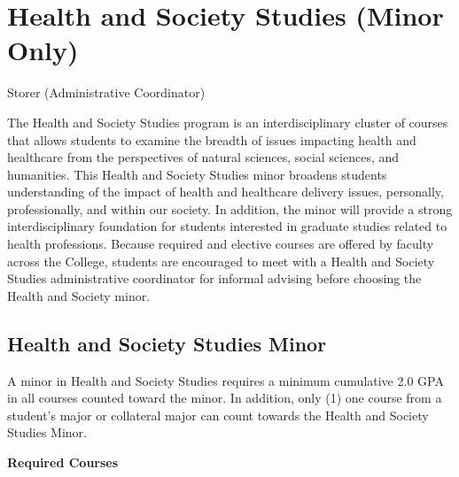 \documentclass[
  letterpaper,
]{scrbook}
\begin{document}
\section{Health and Society Studies (Minor
Only)}\label{health-and-society-studies-minor-only}

Storer (Administrative Coordinator)

The Health and Society Studies program is an interdisciplinary cluster
of courses that allows students to examine the breadth of issues
impacting health and healthcare from the perspectives of natural
sciences, social sciences, and humanities. This Health and Society
Studies minor broadens students understanding of the impact of health
and healthcare delivery issues, personally, professionally, and within
our society. In addition, the minor will provide a strong
interdisciplinary foundation for students interested in graduate studies
related to health professions. Because required and elective courses are
offered by faculty across the College, students are encouraged to meet
with a Health and Society Studies administrative coordinator for
informal advising before choosing the Health and Society minor.

\subsection{Health and Society Studies
Minor}\label{health-and-society-studies-minor}

A minor in Health and Society Studies requires a minimum cumulative 2.0
GPA in all courses counted toward the minor. In addition, only (1) one
course from a student's major or collateral major can count towards the
Health and Society Studies Minor.

\textbf{Required Courses}
\end{document}
